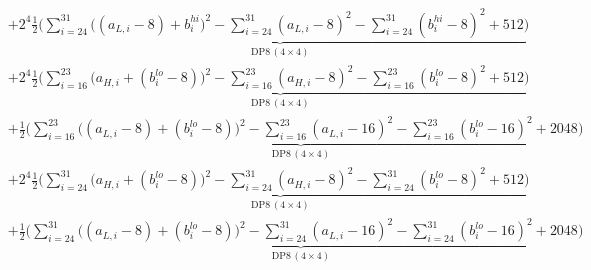 \documentclass[fleqn]{article}
\newcommand{\DPop}[3]{\mathrm{DP#1}\,(#2\!\times\!#3)}
\begin{document}
\begin{align*}
  & + 2^{4}\underbrace{\tfrac12\Big(\sum_{i=24}^{31}\big((a_{L,i}{-}8){+}b_i^{hi}\big)^2 - \sum_{i=24}^{31}(a_{L,i}{-}8)^2 - \sum_{i=24}^{31}(b_i^{hi}{-}8)^2 + 512\Big)}_{\DPop{8}{4}{4}} \\[0.5em]
  & + 2^{4}\underbrace{\tfrac12\Big(\sum_{i=16}^{23}\big(a_{H,i}{+}(b_i^{lo}{-}8)\big)^2 - \sum_{i=16}^{23}(a_{H,i}{-}8)^2 - \sum_{i=16}^{23}(b_i^{lo}{-}8)^2 + 512\Big)}_{\DPop{8}{4}{4}} \\[0.5em]
  & + \underbrace{\tfrac12\Big(\sum_{i=16}^{23}\big((a_{L,i}{-}8){+}(b_i^{lo}{-}8)\big)^2 - \sum_{i=16}^{23}(a_{L,i}{-}16)^2 - \sum_{i=16}^{23}(b_i^{lo}{-}16)^2 + 2048\Big)}_{\DPop{8}{4}{4}} \\[0.5em]
  & + 2^{4}\underbrace{\tfrac12\Big(\sum_{i=24}^{31}\big(a_{H,i}{+}(b_i^{lo}{-}8)\big)^2 - \sum_{i=24}^{31}(a_{H,i}{-}8)^2 - \sum_{i=24}^{31}(b_i^{lo}{-}8)^2 + 512\Big)}_{\DPop{8}{4}{4}} \\[0.5em]
  & + \underbrace{\tfrac12\Big(\sum_{i=24}^{31}\big((a_{L,i}{-}8){+}(b_i^{lo}{-}8)\big)^2 - \sum_{i=24}^{31}(a_{L,i}{-}16)^2 - \sum_{i=24}^{31}(b_i^{lo}{-}16)^2 + 2048\Big)}_{\DPop{8}{4}{4}}
\end{align*}
\end{document}
